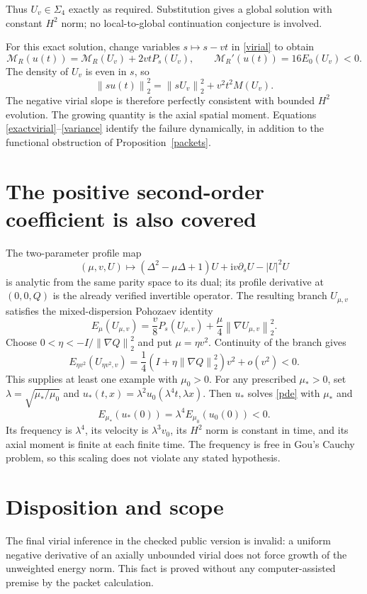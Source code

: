 \documentclass[11pt,a4paper]{article}
\newcommand{\ii}{\mathrm i}
\newcommand{\norm}[1]{\left\|#1\right\|}
\begin{document}
Thus $U_v\in\Sigma_4$ exactly as required. Substitution gives a global solution with constant $H^2$ norm; no local-to-global continuation conjecture is involved.

For this exact solution, change variables $s\mapsto s-vt$ in \eqref{virial} to obtain
\begin{equation}\label{exactvirial}
 \mathcal M_R(u(t))=\mathcal M_R(U_v)+2vtP_s(U_v),
 \qquad\mathcal M_R'(u(t))=16E_0(U_v)<0.
\end{equation}
The density of $U_v$ is even in $s$, so
\begin{equation}\label{variance}
 \norm{su(t)}_2^2=\norm{sU_v}_2^2+v^2t^2M(U_v).
\end{equation}
The negative virial slope is therefore perfectly consistent with bounded $H^2$ evolution. The growing quantity is the axial spatial moment. Equations \eqref{exactvirial}--\eqref{variance} identify the failure dynamically, in addition to the functional obstruction of Proposition~\ref{packets}.

\section{The positive second-order coefficient is also covered}
The two-parameter profile map
\[
 (\mu,v,U)\longmapsto(\Delta^2-\mu\Delta+1)U+
 \ii v\partial_sU-|U|^2U
\]
is analytic from the same parity space to its dual; its profile derivative at $(0,0,Q)$ is the already verified invertible operator. The resulting branch $U_{\mu,v}$ satisfies the mixed-dispersion Pohozaev identity
\begin{equation}\label{mixed}
 E_\mu(U_{\mu,v})=\frac v8P_s(U_{\mu,v})+
 \frac\mu4\norm{\nabla U_{\mu,v}}_2^2.
\end{equation}
Choose $0<\eta<-I/\norm{\nabla Q}_2^2$ and put $\mu=\eta v^2$. Continuity of the branch gives
\[
 E_{\eta v^2}(U_{\eta v^2,v})=
 \frac14\left(I+\eta\norm{\nabla Q}_2^2\right)v^2+o(v^2)<0.
\]
This supplies at least one example with $\mu_0>0$. For any prescribed $\mu_*>0$, set $\lambda=\sqrt{\mu_*/\mu_0}$ and $u_*(t,x)=\lambda^2u_0(\lambda^4t,\lambda x)$. Then $u_*$ solves \eqref{pde} with $\mu_*$ and
\[
 E_{\mu_*}(u_*(0))=\lambda^4E_{\mu_0}(u_0(0))<0.
\]
Its frequency is $\lambda^4$, its velocity is $\lambda^3v_0$, its $H^2$ norm is constant in time, and its axial moment is finite at each finite time. The frequency is free in Gou's Cauchy problem, so this scaling does not violate any stated hypothesis.

\section{Disposition and scope}
The final virial inference in the checked public version is invalid: a uniform negative derivative of an axially unbounded virial does not force growth of the unweighted energy norm. This fact is proved without any computer-assisted premise by the packet calculation.
\end{document}
